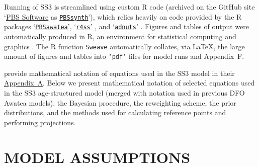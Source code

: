 \documentclass[11pt]{book}
\newcommand{\code}[1]{\normalsize\texttt{#1}\normalsize}%
\newcommand{\AppRes}{Appendix~F}
\begin{document}
Running of SS3 is streamlined using custom R code (archived on the GitHub site `\href{https://github.com/pbs-software}{PBS Software} as \href{https://github.com/pbs-software/pbs-synth}{\code{PBSsynth}}'), which relies heavily on code provided by the R packages `\href{https://github.com/pbs-software/pbs-awatea}{\code{PBSawatea}}', `\href{https://github.com/r4ss/r4ss}{\code{r4ss}}' \citep{R:2020_r4ss}, and `\href{https://github.com/Cole-Monnahan-NOAA/adnuts}{\code{adnuts}}' \citep{R:2018_adnuts}.
Figures and tables of output were automatically produced in R, an environment for statistical computing and graphics \citep{R:2021_base}. 
The R function \code{Sweave} \citep{Leisch:2002} automatically collates, via \LaTeX, the large amount of figures and tables into \code{`pdf'} files for model runs and \AppRes.

\citet{Methot-Wetzel:2013} provide mathematical notation of equations used in the SS3 model in their \href{https://sedarweb.org/docs/wsupp/S39_RD_08_Methot_and_Wetzel_2013_Fish_Res_App_A.pdf}{Appendix~A}.
Below we present mathematical notation of selected equations used in the SS3 age-structured model (merged with notation used in previous DFO Awatea models), the Bayesian procedure, the reweighting scheme, the prior distributions, and the methods used for calculating reference points and performing projections.

\section{MODEL ASSUMPTIONS}
\end{document}

